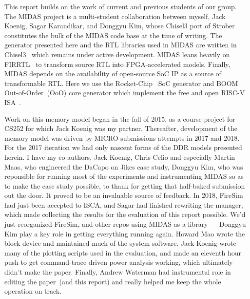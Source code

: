 This report builds on the work of current and previous students of our group.
The MIDAS project is a multi-student collaboration between myself, Jack Koenig,
Sagar Karandikar, and Donggyu Kim, whose Chisel3 port of Strober~\cite{strober}
constitutes the bulk of the MIDAS code base at the time of writing. The
generator presented here and the RTL libraries used in MIDAS are written in
Chisel3~\cite{chisel} which remains under active development. MIDAS leans
heavily on FIRRTL~\cite{firrtl} to transform source RTL into FPGA-accelerated
models.  Finally, MIDAS depends on the availability of open-source SoC IP as a
source of transformable RTL. Here we use the Rocket-Chip~\cite{rocketchip} SoC
generator and BOOM~\cite{boom} Out-of-Order~(OoO) core generator which
implement the free and open RISC-V ISA~\cite{riscv}.

Work on this memory model began in the fall of 2015, as a course project for
CS252 for which Jack Koenig was my partner. Thereafter, development of the
memory model was driven by MICRO submissions attempts in 2017 and 2018. For the
2017 iteration we had only nascent forms of the DDR models presented herein. I
have my co-authors, Jack Koenig, Chris Celio and especially Martin Maas, who
engineered the DaCapo on Jikes case study, Donggyu Kim, who was reponsible for
running most of the experiments and instrumenting MIDAS so as to make the case
study possible, to thank for getting that half-baked submission out the door.
It proved to be an invaluable source of feedback.  In 2018, FireSim had just
been accepted to ISCA, and Sagar had finished rewriting the manager, which made
collecting the results for the evaluation of this report possible. We'd just
reorganized FireSim, and other repos using MIDAS as a library --- Donggyu Kim
play a key role in getting everything running again.  Howard Mao wrote the
block device and maintained much of the system software.  Jack Koenig wrote
many of the plotting scripts used in the evaluation, and made an eleventh hour
push to get command-trace driven power analysis working, which ultimately
didn't make the paper. Finally, Andrew Waterman had instrumental role in
editing the paper~(and this report) and really helped me keep the whole
operation on track.

